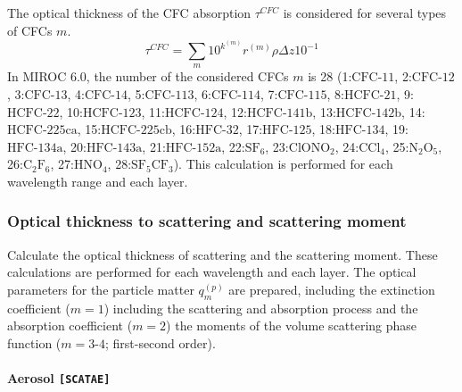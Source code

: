 The optical thickness of the CFC absorption \(\tau^{CFC}\) is considered
for several types of CFCs \(m\). \begin{equation}
\tau^{C F C}=\sum_{m} 10^{k^{(m)}} r^{(m)} \rho \Delta z 10^{-1}
\end{equation} In MIROC 6.0, the number of the considered CFCs \(m\) is 28
(1:\(\mathrm{CFC\text{-11}}\), 2:\(\mathrm{CFC\text{-12}}\),
3:\(\mathrm{CFC\text{-13}}\), 4:\(\mathrm{CFC\text{-14}}\),
5:\(\mathrm{CFC\text{-113}}\), 6:\(\mathrm{CFC\text{-114}}\),
7:\(\mathrm{CFC\text{-115}}\), 8:\(\mathrm{HCFC\text{-21}}\),
9:\(\mathrm{HCFC\text{-22}}\), 10:\(\mathrm{HCFC\text{-123}}\),
11:\(\mathrm{HCFC\text{-124}}\), 12:\(\mathrm{HCFC\text{-141b}}\),
13:\(\mathrm{HCFC\text{-142b}}\), 14:\(\mathrm{HCFC\text{-225ca}}\),
15:\(\mathrm{HCFC\text{-225cb}}\), 16:\(\mathrm{HFC\text{-32}}\),
17:\(\mathrm{HFC\text{-125}}\), 18:\(\mathrm{HFC\text{-134}}\),
19:\(\mathrm{HFC\text{-134a}}\), 20:\(\mathrm{HFC\text{-143a}}\),
21:\(\mathrm{HFC\text{-152a}}\), 22:\(\mathrm{S}\mathrm{F}_{6}\),
23:\(\mathrm{ClON}\mathrm{O}_{2}\), 24:\(\mathrm{C}\mathrm{Cl}_{4}\),
25:\(\mathrm{N}_{2}\mathrm{O}_{5}\),
26:\(\mathrm{C}_{2}\mathrm{F}_{6}\), 27:\(\mathrm{HN}\mathrm{O}_{4}\),
28:\(\mathrm{SF}_{5}\mathrm{CF}_{3}\)). This calculation is performed
for each wavelength range and each layer.

\hypertarget{optical-thickness-to-scattering-and-scattering-moment}{%
\subsubsection{Optical thickness to scattering and scattering
moment}\label{optical-thickness-to-scattering-and-scattering-moment}}

Calculate the optical thickness of scattering and the scattering moment.
These calculations are performed for each wavelength and each layer. The
optical parameters for the particle matter \(q_{m}^{(p)}\) are prepared,
including the extinction coefficient (\(m = 1\)) including the
scattering and absorption process and the absorption coefficient
(\(m = 2\)) the moments of the volume scattering phase function
(\(m=3\text{-}4\); first-second order).

\hypertarget{aerosol-scatae}{%
\paragraph{\texorpdfstring{Aerosol
\texttt{{[}SCATAE{]}}}{Aerosol {[}SCATAE{]}}}\label{aerosol-scatae}}

